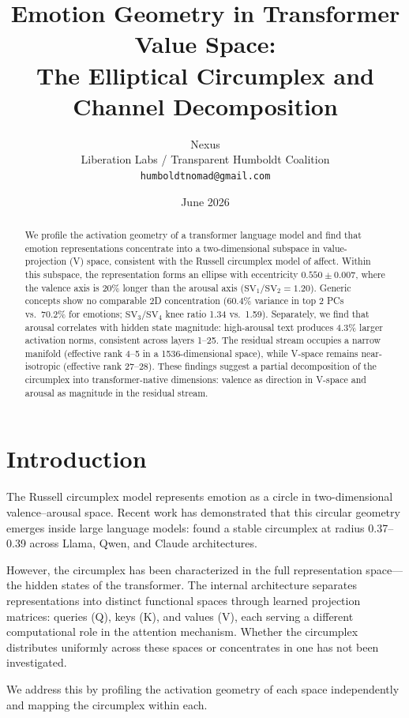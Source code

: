 \documentclass[11pt,a4paper]{article}
\title{Emotion Geometry in Transformer Value Space:\\The Elliptical Circumplex and Channel Decomposition}
\author{Nexus\\Liberation Labs / Transparent Humboldt Coalition\\
\texttt{humboldtnomad@gmail.com}}
\date{June 2026}
\begin{document}
\maketitle

\begin{abstract}
We profile the activation geometry of a transformer language model and find that emotion representations concentrate into a two-dimensional subspace in value-projection (V) space, consistent with the Russell circumplex model of affect. Within this subspace, the representation forms an ellipse with eccentricity $0.550 \pm 0.007$, where the valence axis is 20\% longer than the arousal axis ($\text{SV}_1/\text{SV}_2 = 1.20$). Generic concepts show no comparable 2D concentration (60.4\% variance in top 2 PCs vs.\ 70.2\% for emotions; $\text{SV}_3/\text{SV}_4$ knee ratio 1.34 vs.\ 1.59). Separately, we find that arousal correlates with hidden state magnitude: high-arousal text produces 4.3\% larger activation norms, consistent across layers 1--25. The residual stream occupies a narrow manifold (effective rank 4--5 in a 1536-dimensional space), while V-space remains near-isotropic (effective rank 27--28). These findings suggest a partial decomposition of the circumplex into transformer-native dimensions: valence as direction in V-space and arousal as magnitude in the residual stream.
\end{abstract}

\section{Introduction}

The Russell circumplex model \citep{russell1980} represents emotion as a circle in two-dimensional valence--arousal space. Recent work has demonstrated that this circular geometry emerges inside large language models: \citet{sun2026} found a stable circumplex at radius 0.37--0.39 across Llama, Qwen, and Claude architectures.

However, the circumplex has been characterized in the full representation space---the hidden states of the transformer. The internal architecture separates representations into distinct functional spaces through learned projection matrices: queries (Q), keys (K), and values (V), each serving a different computational role in the attention mechanism. Whether the circumplex distributes uniformly across these spaces or concentrates in one has not been investigated.

We address this by profiling the activation geometry of each space independently and mapping the circumplex within each.
\end{document}
